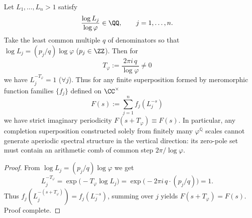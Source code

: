 \begin{conclusion}\label{con:xi-terminal-phi-q-scale-mix-common-imag-period}
Let \(L_1,\dots,L_n>1\) satisfy
\[
\frac{\log L_j}{\log\varphi}\in\QQ,\qquad j=1,\dots,n.
\]
Take the least common multiple \(q\) of denominators so that \(\log L_j=(p_j/q)\log\varphi\) (\(p_j\in\ZZ\)).
Then for
\[
T_{\varphi}:=\frac{2\pi i\,q}{\log\varphi}\neq 0
\]
we have \(L_j^{-T_{\varphi}}=1\) (\(\forall j\)).
Thus for any finite superposition formed by meromorphic function families \(\{f_j\}\) defined on \(\CC^{\times}\)
\[
F(s):=\sum_{j=1}^{n} f_j(L_j^{-s})
\]
we have strict imaginary periodicity \(F(s+T_{\varphi})\equiv F(s)\).
In particular, any completion superposition constructed solely from finitely many \(\varphi^{\mathbb Q}\) scales cannot generate aperiodic spectral structure in the vertical direction: its zero-pole set must contain an arithmetic comb of common step \(2\pi/\log\varphi\).
\end{conclusion}
\begin{proof}[Proof]
From \(\log L_j=(p_j/q)\log\varphi\) we get
\[
L_j^{-T_{\varphi}}=\exp\!\bigl(-T_{\varphi}\log L_j\bigr)
=\exp\!\bigl(-2\pi i\,q\cdot (p_j/q)\bigr)=1.
\]
Thus \(f_j(L_j^{-(s+T_{\varphi})})=f_j(L_j^{-s})\), summing over \(j\) yields \(F(s+T_{\varphi})=F(s)\). Proof complete.
\end{proof}
